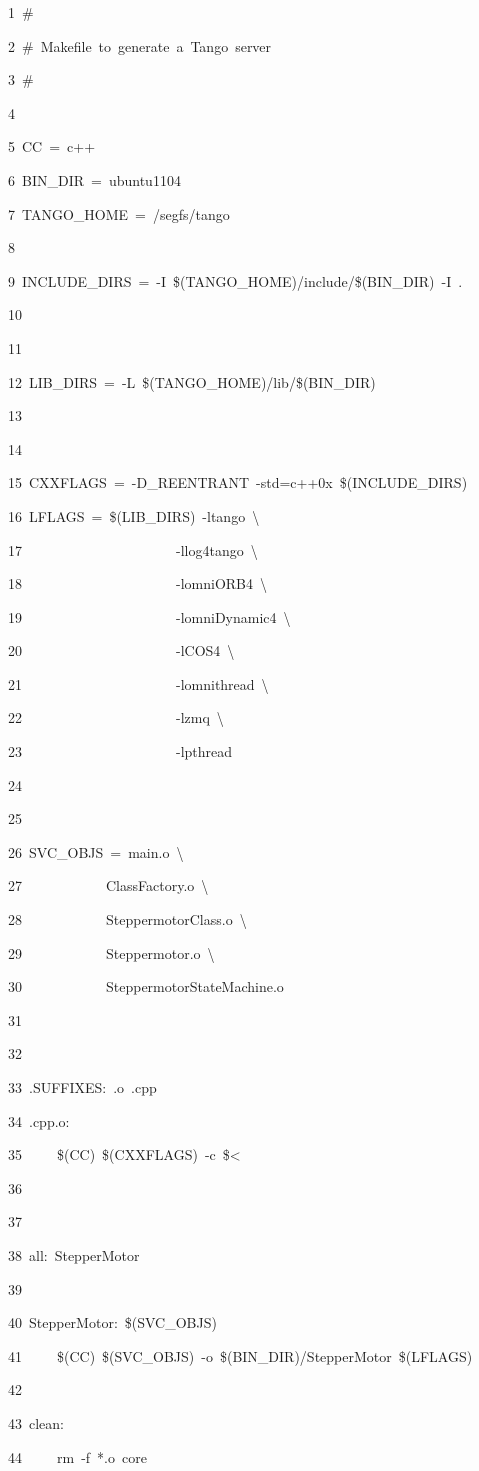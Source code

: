 
\begin{lyxcode}
1~\#

2~\#~Makefile~to~generate~a~Tango~server

3~\#

4~

5~CC~=~c++

6~BIN\_DIR~=~ubuntu1104

7~TANGO\_HOME~=~/segfs/tango

8~

9~INCLUDE\_DIRS~=~-I~\$(TANGO\_HOME)/include/\$(BIN\_DIR)~-I~.

10

11~

12~LIB\_DIRS~=~-L~\$(TANGO\_HOME)/lib/\$(BIN\_DIR)

13~

14~

15~CXXFLAGS~=~-D\_REENTRANT~-std=c++0x~\$(INCLUDE\_DIRS)

16~LFLAGS~=~\$(LIB\_DIRS)~-ltango~\textbackslash{}

17~~~~~~~~~~~~~~~~~~~~~~-llog4tango~\textbackslash{}

18~~~~~~~~~~~~~~~~~~~~~~-lomniORB4~\textbackslash{}

19~~~~~~~~~~~~~~~~~~~~~~-lomniDynamic4~\textbackslash{}

20~~~~~~~~~~~~~~~~~~~~~~-lCOS4~\textbackslash{}

21~~~~~~~~~~~~~~~~~~~~~~-lomnithread~\textbackslash{}

22~~~~~~~~~~~~~~~~~~~~~~-lzmq~\textbackslash{}

23~~~~~~~~~~~~~~~~~~~~~~-lpthread

24~

25~

26~SVC\_OBJS~=~main.o~\textbackslash{}

27~~~~~~~~~~~~ClassFactory.o~\textbackslash{}

28~~~~~~~~~~~~SteppermotorClass.o~\textbackslash{}

29~~~~~~~~~~~~Steppermotor.o~\textbackslash{}

30~~~~~~~~~~~~SteppermotorStateMachine.o

31~

32~

33~.SUFFIXES:~.o~.cpp

34~.cpp.o:

35~~~~~\$(CC)~\$(CXXFLAGS)~-c~\$<

36~

37~

38~all:~StepperMotor

39~

40~StepperMotor:~\$(SVC\_OBJS)

41~~~~~\$(CC)~\$(SVC\_OBJS)~-o~\$(BIN\_DIR)/StepperMotor~\$(LFLAGS)

42~

43~clean:

44~~~~~rm~-f~{*}.o~core
\end{lyxcode}




